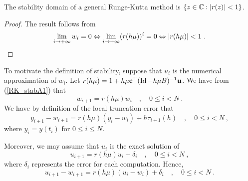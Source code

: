 \begin{cor}
The stability domain of a general Runge-Kutta method is
$\{ z \in \mathbb{C} : |r(z)| < 1 \}$.
\label{RKstabReg}
\end{cor}

\begin{proof}
The result follows from
\[
\lim_{i\rightarrow +\infty} w_i = 0
\Leftrightarrow \lim_{i\rightarrow +\infty}(r(h\mu))^i = 0
\Leftrightarrow |r(h\mu)| < 1 \ .   \qedhere
\]
\end{proof}

\begin{rmk}
To motivate the definition of stability, suppose that $u_i$ is the
numerical approximation of $w_i$.  Let
$r(h\mu) = 1 + h\mu \mathbf{c}^{\top}(\operatorname{Id}-h\mu B)^{-1}\mathbf{u}$.  We have from
(\ref{RK_stabA1}) that
\[
 w_{i+1} = r(h\mu) w_i \quad , \quad 0\leq i < N \ .
\]
We have by definition of the local truncation error that
\begin{equation}\label{RKstabMotivA}
y_{i+1}- w_{i+1} = r(h\mu) (y_i- w_i) + h \tau_{i+1}(h) \quad ,
\quad 0\leq i < N \ ,
\end{equation}
where $y_i = y(t_i)$ for $0\leq i \leq N$.

Moreover, we may assume that $u_i$ is the exact solution of
\[
  u_{i+1} = r(h\mu) u_i + \delta_i \quad , \quad 0\leq i < N \ ,
\]
where $\delta_i$ represents the error for each computation.  Hence,
\begin{equation}\label{RKstabMotivB}
  u_{i+1} - w_{i+1} = r(h\mu) (u_i -w_i) + \delta_i \quad , \quad 0\leq i < N \ .
\end{equation}


\end{rmk}
